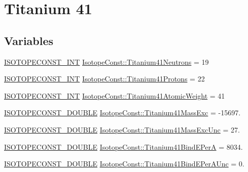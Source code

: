 \hypertarget{group___isotope_const-_titanium-_ti41}{}\section{Titanium 41}
\label{group___isotope_const-_titanium-_ti41}
\subsection*{Variables}
\begin{DoxyCompactItemize}
\item 
\mbox{\hyperlink{group___isotope_const-_macros_ga5f18360b3e99483a35c32d789e62621c}{I\+S\+O\+T\+O\+P\+E\+C\+O\+N\+S\+T\+\_\+\+I\+NT}} \mbox{\hyperlink{group___isotope_const-_titanium-_ti41_ga921475f62dc0776ba0ac22cd45b6ae63}{Isotope\+Const\+::\+Titanium41\+Neutrons}} = 19
\item 
\mbox{\hyperlink{group___isotope_const-_macros_ga5f18360b3e99483a35c32d789e62621c}{I\+S\+O\+T\+O\+P\+E\+C\+O\+N\+S\+T\+\_\+\+I\+NT}} \mbox{\hyperlink{group___isotope_const-_titanium-_ti41_gab93c3ecc6a94269656ac178aeaab5dac}{Isotope\+Const\+::\+Titanium41\+Protons}} = 22
\item 
\mbox{\hyperlink{group___isotope_const-_macros_ga5f18360b3e99483a35c32d789e62621c}{I\+S\+O\+T\+O\+P\+E\+C\+O\+N\+S\+T\+\_\+\+I\+NT}} \mbox{\hyperlink{group___isotope_const-_titanium-_ti41_gaf224fff0cfcbbf28ae46f0d80af3e9a1}{Isotope\+Const\+::\+Titanium41\+Atomic\+Weight}} = 41
\item 
\mbox{\hyperlink{group___isotope_const-_macros_ga8f45a7272ce02c0b4c65c44636ed719a}{I\+S\+O\+T\+O\+P\+E\+C\+O\+N\+S\+T\+\_\+\+D\+O\+U\+B\+LE}} \mbox{\hyperlink{group___isotope_const-_titanium-_ti41_gaa92c6821a25cc351f32e5e8dc4d495bf}{Isotope\+Const\+::\+Titanium41\+Mass\+Exc}} = -\/15697.
\item 
\mbox{\hyperlink{group___isotope_const-_macros_ga8f45a7272ce02c0b4c65c44636ed719a}{I\+S\+O\+T\+O\+P\+E\+C\+O\+N\+S\+T\+\_\+\+D\+O\+U\+B\+LE}} \mbox{\hyperlink{group___isotope_const-_titanium-_ti41_gaeaa4681b87bdb19654b27ef4d8522555}{Isotope\+Const\+::\+Titanium41\+Mass\+Exc\+Unc}} = 27.
\item 
\mbox{\hyperlink{group___isotope_const-_macros_ga8f45a7272ce02c0b4c65c44636ed719a}{I\+S\+O\+T\+O\+P\+E\+C\+O\+N\+S\+T\+\_\+\+D\+O\+U\+B\+LE}} \mbox{\hyperlink{group___isotope_const-_titanium-_ti41_ga70f14ed0a72ee93d0199a71dbbae9ef3}{Isotope\+Const\+::\+Titanium41\+Bind\+E\+PerA}} = 8034.
\item 
\mbox{\hyperlink{group___isotope_const-_macros_ga8f45a7272ce02c0b4c65c44636ed719a}{I\+S\+O\+T\+O\+P\+E\+C\+O\+N\+S\+T\+\_\+\+D\+O\+U\+B\+LE}} \mbox{\hyperlink{group___isotope_const-_titanium-_ti41_gae6fce1e32fde96162a7897958c41c2a6}{Isotope\+Const\+::\+Titanium41\+Bind\+E\+Per\+A\+Unc}} = 0.

\end{DoxyCompactItemize}
